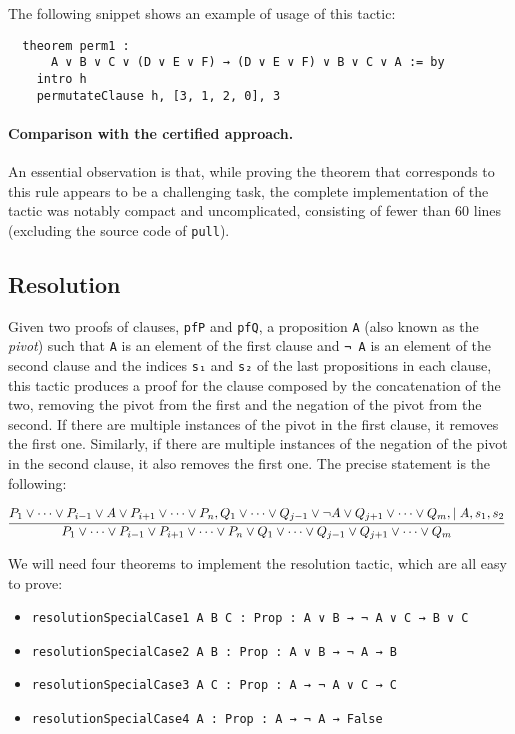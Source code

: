 The following snippet shows an example of usage of this tactic:

\begin{verbatim}
  theorem perm1 :
      A ∨ B ∨ C ∨ (D ∨ E ∨ F) → (D ∨ E ∨ F) ∨ B ∨ C ∨ A := by
    intro h
    permutateClause h, [3, 1, 2, 0], 3
\end{verbatim}

\paragraph{Comparison with the certified approach.} An essential observation is that, while proving the theorem that corresponds to this rule appears to be a
challenging task, the complete implementation of the tactic was notably compact and uncomplicated, consisting of fewer
than 60 lines (excluding the source code of \texttt{pull}).


\subsection{Resolution}

Given two proofs of clauses, \texttt{pfP} and \texttt{pfQ}, a proposition \texttt{A}
(also known as the \textit{pivot}) such that
\texttt{A} is an element of the first clause and \texttt{¬ A} is an element of the second clause and the indices \texttt{s₁} and \texttt{s₂} of the last propositions in each clause, this tactic produces a proof for the clause composed by the concatenation
of the two, removing the pivot from the first and the negation of the pivot from the second. If there are multiple instances of the pivot in the first clause, it removes
the first one. Similarly, if there are multiple instances of the negation of the pivot
in the second clause, it also removes the first one. The precise statement
is the following:

\[
  \infer[]{P_{1} \vee \cdots \vee P_{i - 1} \vee P_{i + 1} \vee \cdots \vee P_{n} \vee Q_{1} \vee \cdots \vee Q_{j - 1} \vee Q_{j + 1} \vee \cdots \vee Q_{m}}{P_{1} \vee \cdots \vee P_{i - 1} \vee A \vee P_{i + 1} \vee \cdots \vee P_{n}, Q_{1} \vee \cdots \vee Q_{j - 1} \vee \neg A \vee Q_{j + 1} \vee \cdots \vee Q_{m}, \mid A, s_{1}, s_{2}}
\]

We will need four theorems to implement the resolution tactic, which are all easy to prove:

\begin{itemize}
  \item \texttt{resolutionSpecialCase1 {A B C : Prop} : A ∨ B → ¬ A ∨ C → B ∨ C}
  \item \texttt{resolutionSpecialCase2 {A B : Prop} : A ∨ B → ¬ A → B}
  \item \texttt{resolutionSpecialCase3 {A C : Prop} : A → ¬ A ∨ C → C}
  \item \texttt{resolutionSpecialCase4 {A : Prop} : A → ¬ A → False}
\end{itemize}

